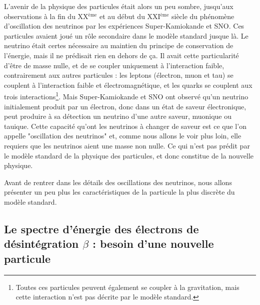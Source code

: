 		    L'avenir de la physique des particules était alors un peu sombre, jusqu'aux observations à la fin du XX$^{\text{ème}}$ et au début du XXI$^{\text{ème}}$ siècle du phénomène d'oscillation des neutrinos par les expériences Super-Kamiokande\cite{Fukuda1998} et SNO\cite{Aharmim2013}. Ces particules avaient joué un rôle secondaire dans le modèle standard jusque là. Le neutrino était certes nécessaire au maintien du principe de conservation de l'énergie, mais il ne prédisait rien en dehors de ça. Il avait cette particularité d'être de masse nulle, et de se coupler uniquement à l'interaction faible, contrairement aux autres particules : les leptons (électron, muon et tau) se couplent à l'interaction faible et électromagnétique, et les quarks se couplent aux trois interactions\footnote{Toutes ces particules peuvent également se coupler à la gravitation, mais cette interaction n'est pas décrite par le modèle standard.}. Mais Super-Kamiokande et SNO ont observé qu'un neutrino initialement produit par un électron, donc dans un état de saveur électronique, peut produire à sa détection un neutrino d'une autre saveur, muonique ou tauique. Cette capacité qu'ont les neutrinos à changer de saveur est ce que l'on appelle "oscillation des neutrinos" et, comme nous allons le voir plus loin, elle requiers que les neutrinos aient une masse non nulle. Ce qui n'est pas prédit par le modèle standard de la physique des particules, et donc constitue de la nouvelle physique.
		    
		    Avant de rentrer dans les détails des oscillations des neutrinos, nous allons présenter un peu plus les caractéristiques de la particule la plus discrète du modèle standard.
		    		    
    
        \subsection{Le spectre d'énergie des électrons de désintégration \texorpdfstring{$\beta$}{b} : besoin d'une nouvelle particule}\label{sec::neutrino_origin}
        
